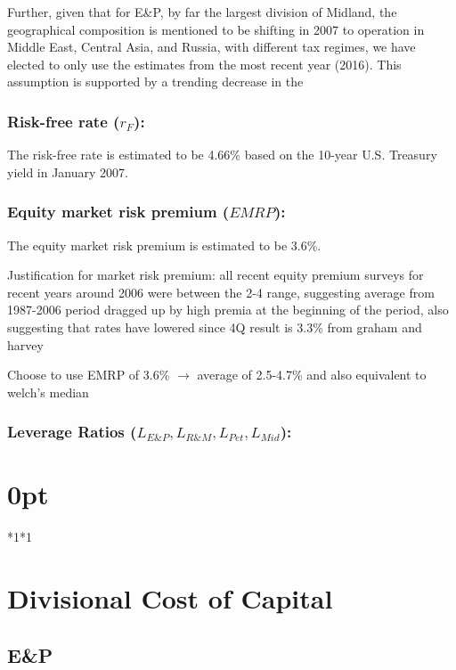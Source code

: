 \documentclass{article}
\begin{document}
Further, given that for E\&P, by far the largest division of Midland, the geographical composition is mentioned to be shifting in 2007 to operation in Middle East, Central Asia, and Russia, with different tax regimes, we have elected to only use the estimates from the most recent year (2016). This assumption is supported by a trending decrease in the

\subsubsection*{Risk-free rate ($r_F$):} The risk-free rate is estimated to be 4.66\% based on the 10-year U.S. Treasury yield in January 2007.

\subsubsection*{Equity market risk premium ($EMRP$):} The equity market risk premium is estimated to be 3.6\%.

Justification for market risk premium: all recent equity premium surveys for recent years around 2006  were between the 2-4 range, suggesting average from 1987-2006 period dragged up by high premia at the beginning of the period, also suggesting that rates have lowered since
4Q result is 3.3\% from graham and harvey

Choose to use EMRP of 3.6\% $\rightarrow$ average of 2.5-4.7\% and also equivalent to welch’s median

\subsubsection*{Leverage Ratios ($L_{E\&P},L_{R\&M}, L_{Pet}, L_{Mid}$):} 

\titlespacing\section{0pt}{*1}{*1}
\hrulefill
\section{Divisional Cost of Capital}
\subsection{E\&P}
\end{document}
